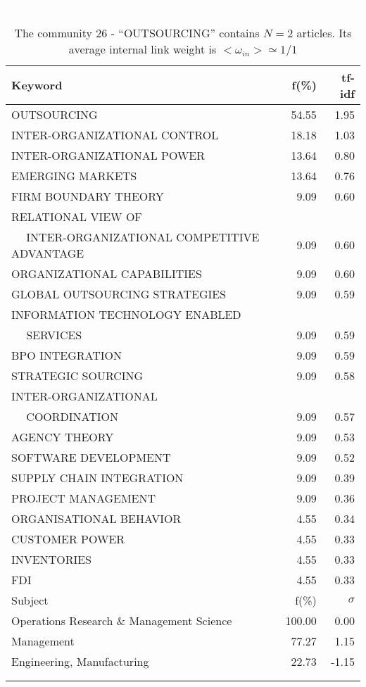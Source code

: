 \documentclass[a4paper,11pt]{report}
\begin{document}
\begin{landscape}
\begin{table}[!ht]
\caption{The community 26 - ``OUTSOURCING'' contains $N = 2$ articles. Its average internal link weight is $<\omega_{in}> \simeq 1/1$ }
\textcolor{white}{aa}\\
{\scriptsize\begin{tabular}{|l r  r|}
\hline
Keyword & f(\%) & tf-idf \\
\hline
OUTSOURCING & 54.55 & 1.95\\
INTER-ORGANIZATIONAL CONTROL & 18.18 & 1.03\\
INTER-ORGANIZATIONAL POWER & 13.64 & 0.80\\
EMERGING MARKETS & 13.64 & 0.76\\
FIRM BOUNDARY THEORY & 9.09 & 0.60\\
RELATIONAL VIEW OF &  &\\
$\quad$ INTER-ORGANIZATIONAL COMPETITIVE ADVANTAGE & 9.09 & 0.60\\
ORGANIZATIONAL CAPABILITIES & 9.09 & 0.60\\
GLOBAL OUTSOURCING STRATEGIES & 9.09 & 0.59\\
INFORMATION TECHNOLOGY ENABLED &  &\\
$\quad$ SERVICES & 9.09 & 0.59\\
BPO INTEGRATION & 9.09 & 0.59\\
STRATEGIC SOURCING & 9.09 & 0.58\\
INTER-ORGANIZATIONAL &  &\\
$\quad$ COORDINATION & 9.09 & 0.57\\
AGENCY THEORY & 9.09 & 0.53\\
SOFTWARE DEVELOPMENT & 9.09 & 0.52\\
SUPPLY CHAIN INTEGRATION & 9.09 & 0.39\\
PROJECT MANAGEMENT & 9.09 & 0.36\\
ORGANISATIONAL BEHAVIOR & 4.55 & 0.34\\
CUSTOMER POWER & 4.55 & 0.33\\
INVENTORIES & 4.55 & 0.33\\
FDI & 4.55 & 0.33\\
\hline
\hline
Subject & f(\%) & $\sigma$\\
\hline
Operations Research \& Management Science & 100.00 & 0.00\\
Management & 77.27 & 1.15\\
Engineering, Manufacturing & 22.73 & -1.15\\
 &  & \\
 &  & \\

\end{tabular}}
\end{table}
\end{landscape}
\end{document}
